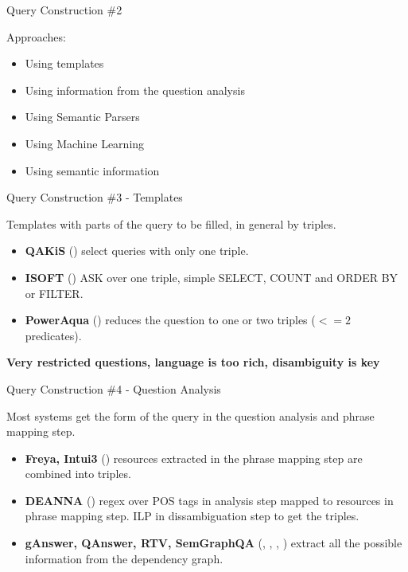 \documentclass{beamer}
\begin{document}
\begin{frame}{Query Construction \#2}
  \begin{card}
    Approaches:
    \begin{itemize}
      \item Using templates
      \item Using information from the question analysis
      \item Using Semantic Parsers
      \item Using Machine Learning
      \item Using semantic information
    \end{itemize}
  \end{card}
\end{frame}

\note{}

\begin{frame}{Query Construction \#3 - Templates}
  \begin{card}
    Templates with parts of the query to be filled, in general by triples.
    \begin{itemize}
      \item \textbf{QAKiS} (\cite{cabrio2012a}) select queries with only one triple.
      \item \textbf{ISOFT} (\cite{park2014a}) ASK over one triple, simple SELECT, COUNT and ORDER BY or FILTER.
      \item \textbf{PowerAqua} (\cite{lopez2012a}) reduces the question to one or two triples ($<=2$ predicates).
    \end{itemize}
    \textbf{Very restricted questions, language is too rich, disambiguity is key}
  \end{card}
\end{frame}

\note{}

\begin{frame}{Query Construction \#4 - Question Analysis}
  \begin{card}
    Most systems get the form of the query in the question analysis and phrase mapping step.
    \begin{itemize}
      \item \textbf{Freya, Intui3} (\cite{dima2014a}) resources extracted in the phrase mapping step are combined into triples.
      \item \textbf{DEANNA} (\cite{yahya2013a}) regex over POS tags in analysis step mapped to resources in phrase mapping step. ILP in dissambiguation step to get the triples.
      \item \textbf{gAnswer, QAnswer, RTV, SemGraphQA} (\cite{zou2014a}, \cite{ruseti2015a}, \cite{giannone2013a}, \cite{beaumont2015a}) extract all the possible information from the dependency graph.
    \end{itemize}
  \end{card}
\end{frame}
\end{document}
